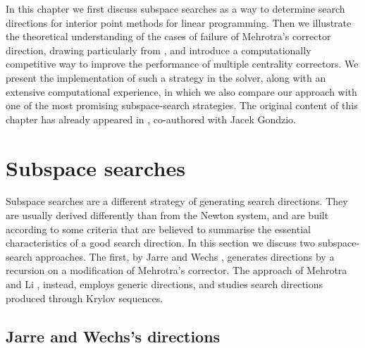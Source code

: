 
%
%
\label{ch:Correctors}

In this chapter we first discuss subspace searches as a way 
to determine search directions for interior point methods
for linear programming.
Then we illustrate the theoretical understanding of 
the cases of failure of Mehrotra's corrector direction,
drawing particularly from \cite{Cartis04,Cartis05}, 
and introduce a computationally competitive way
to improve the performance of multiple centrality correctors.
We present the implementation of such a strategy in the \HOPDM solver,
along with an extensive computational experience, in which
we also compare our approach with one of the most promising
subspace-search strategies.
The original content of this chapter has already appeared 
in \cite{ColomboGondzio05}, co-authored with Jacek Gondzio.


%
%
\section{Subspace searches}
\label{sec:SubspaceSearches}

Subspace searches are a different strategy of generating search 
directions. 
They are usually derived differently than from the Newton system, and 
are built according to some criteria that are believed to summarise
the essential characteristics of a good search direction.
In this section we discuss two subspace-search approaches. 
The first, by Jarre and Wechs \cite{JarreWechs}, generates directions
by a recursion on a modification of Mehrotra's corrector.
The approach of Mehrotra and Li \cite{MehrotraLi}, instead, 
employs generic directions, and studies search directions
produced through Krylov sequences.

%
%
\subsection{Jarre and Wechs's directions}
\label{sec:JarreWechs}

